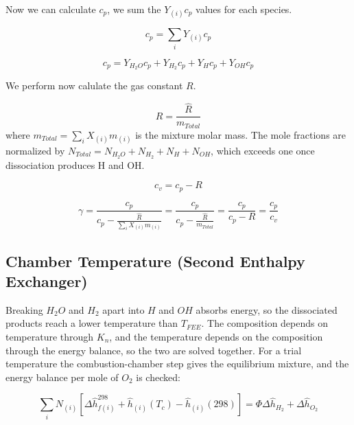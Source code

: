 \documentclass[12pt, Times New Roman]{article}
\begin{document}
    Now we can calculate $c_{p}$, we sum the $Y_{(i)}c_{p}$ values for each species.

    \begin{equation}
        c_{p} = \sum_{i} Y_{(i)}c_{p}
    \end{equation}

    \begin{equation}
        c_{p} = Y_{H_{2}O}c_{p} + Y_{H_{2}}c_{p} + Y_{H}c_{p} + Y_{OH}c_{p}
    \end{equation}

    We perform now calulate the gas constant $R$.

    \begin{equation}
        R = \frac{\hat{R}}{m_{Total}}
    \end{equation}
    where $m_{Total} = \sum_{i} X_{(i)} m_{(i)}$ is the mixture molar mass. The mole fractions are normalized by
    $N_{Total} = N_{H_{2}O} + N_{H_{2}} + N_{H} + N_{OH}$, which exceeds one once dissociation produces H and OH.

    \begin{equation}
        c_{v} = c_{p} - R
    \end{equation}

    \begin{equation}
        \gamma = \frac{c_{p}}{c_{p} - \frac{\hat{R}}{\sum_{i} X_{(i)}m_{(i)}}} = \frac{c_{p}}{c_{p}- \frac{\hat{R}}{m_{Total}}} = \frac{c_{p}}{c_{p}- R} = \frac{c_{p}}{c_{v}}
    \end{equation}
    
    \subsection{Chamber Temperature (Second Enthalpy Exchanger)}
    \label{sec:chamber-temperature}

    Breaking $H_{2}O$ and $H_{2}$ apart into $H$ and $OH$ absorbs energy, so the dissociated products reach a lower
    temperature than $T_{FEE}$. The composition depends on temperature through $K_{n}$, and the temperature depends on the
    composition through the energy balance, so the two are solved together. For a trial temperature the combustion-chamber
    step gives the equilibrium mixture, and the energy balance per mole of $O_{2}$ is checked:

    \begin{equation}
        \sum_{i} N_{(i)} \left[\Delta \hat{h}^{298}_{f(i)} + \hat{h}_{(i)}(T_{c}) - \hat{h}_{(i)}(298)\right] = \Phi \Delta \hat{h}_{H_{2}} + \Delta \hat{h}_{O_{2}}
    \end{equation}
\end{document}
